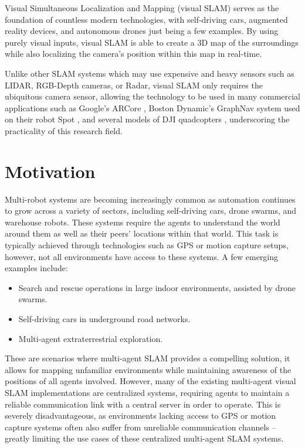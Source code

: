 
\label{sec:1}
Visual Simultaneous Localization and Mapping (visual SLAM) serves as the foundation of countless modern technologies, with self-driving cars, augmented reality devices, and autonomous drones just being a few examples. By using purely visual inputs, visual SLAM is able to create a 3D map of the surroundings while also localizing the camera's position within this map in real-time.

Unlike other SLAM systems which may use expensive and heavy sensors such as LIDAR, RGB-Depth cameras, or Radar, visual SLAM only requires the ubiquitous camera sensor, allowing the technology to be used in many commercial applications such as Google's ARCore \autocite{arcore}, Boston Dynamic's GraphNav system used on their robot Spot \autocite{graphnav}, and several models of DJI quadcopters \autocite{zou2019collaborative}, underscoring the practicality of this research field.

\section{Motivation}
\label{sec:motivation}
Multi-robot systems are becoming increasingly common as automation continues to grow across a variety of sectors, including self-driving cars, drone swarms, and warehouse robots. These systems require the agents to understand the world around them as well as their peers' locations within that world. This task is typically achieved through technologies such as GPS or motion capture setups, however, not all environments have access to these systems. A few emerging examples include: \noparskip
\smallbreak
{
    \begin{itemize}[nosep]
        \item Search and rescue operations in large indoor environments, assisted by drone swarms.
        \item Self-driving cars in underground road networks.
        \item Multi-agent extraterrestrial exploration.
    \end{itemize}
}

These are scenarios where multi-agent SLAM provides a compelling solution, it allows for mapping unfamiliar environments while maintaining awareness of the positions of all agents involved. However, many of the existing multi-agent visual SLAM implementations are centralized systems, requiring agents to maintain a reliable communication link with a central server in order to operate. This is severely disadvantageous, as environments lacking access to GPS or motion capture systems often also suffer from unreliable communication channels – greatly limiting the use cases of these centralized multi-agent SLAM systems.

